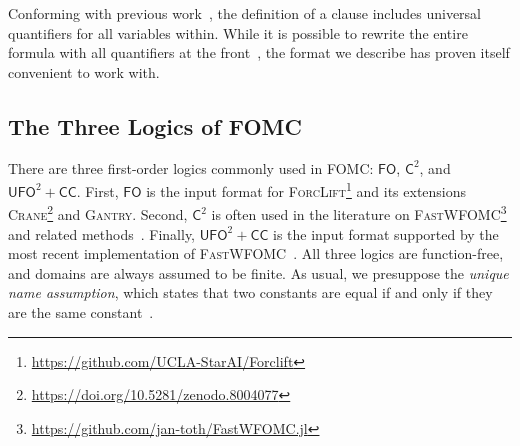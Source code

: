 \documentclass[a4paper,UKenglish,cleveref, autoref, thm-restate]{lipics-v2021}
\newcommand{\cmark}{\ding{51}}
\newcommand{\xmark}{\ding{55}}
\newcommand{\Ctwo}{$\mathsf{C}^{2}$}
\newcommand{\FO}{$\mathsf{FO}$}
\newcommand{\UFO}{$\mathsf{UFO}^{2} + \mathsf{CC}$}
\newcommand{\Cranetwo}{\textsc{Gantry}}
\begin{document}
\begin{remark*}
  Conforming with previous work~\cite{DBLP:conf/ijcai/BroeckTMDR11}, the
  definition of a clause includes universal quantifiers for all variables
  within. While it is possible to rewrite the entire formula with all
  quantifiers at the front~\cite{hinman2018fundamentals}, the format we describe
  has proven itself convenient to work with.
\end{remark*}

\subsection{The Three Logics of FOMC}\label{sec:threelogics}


\renewcommand*{\thefootnote}{\fnsymbol{footnote}}

There are three first-order logics commonly used in FOMC: \FO{}, \Ctwo{}, and
\UFO{}. First, \FO{} is the input format for
\textsc{ForcLift}\footnote{\url{https://github.com/UCLA-StarAI/Forclift}} and
its extensions
\textsc{Crane}\footnote{\url{https://doi.org/10.5281/zenodo.8004077}} and
\Cranetwo{}. Second, \Ctwo{} is often used in the literature on
\textsc{FastWFOMC}\footnote{\url{https://github.com/jan-toth/FastWFOMC.jl}} and
related methods~\cite{DBLP:journals/jair/Kuzelka21,DBLP:conf/aaai/MalhotraS22}.
Finally, \UFO{} is the input format supported by the most recent implementation
of \textsc{FastWFOMC}~\cite{tóth2024complexityweightedfirstordermodel}. All
three logics are function-free, and domains are always assumed to be finite. As
usual, we presuppose the \emph{unique name assumption}, which states that two
constants are equal if and only if they are the same
constant~\cite{DBLP:books/aw/RN2020}.
\end{document}
